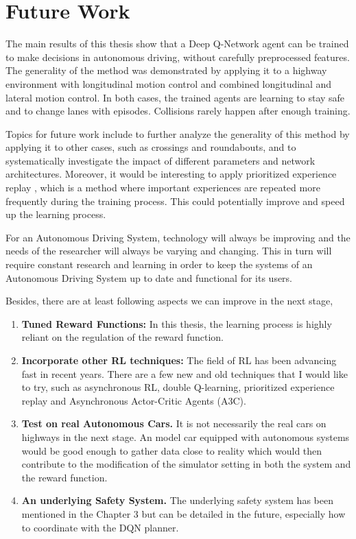 \chapter{Future Work}

The main results of this thesis show that a Deep Q-Network agent can be trained to make decisions in autonomous driving, without carefully preprocessed features. The generality of the method was demonstrated by applying it to a highway environment with longitudinal motion control and combined longitudinal and lateral motion control. In both cases, the trained agents are learning to stay safe and to change lanes with episodes. Collisions rarely happen after enough training. 

Topics for future work include to further analyze the generality of this method by applying it to other cases, such as crossings and roundabouts, and to systematically investigate the impact of different parameters and network architectures. Moreover, it would be interesting to apply prioritized experience replay \cite{Replay2015}, which is a method where important experiences are repeated more frequently during the training process. This could potentially improve and speed up the learning process.

For an Autonomous Driving System, technology will always be improving and the needs of the researcher will always be varying and changing. This in turn will require constant research and learning in order to keep the systems of an Autonomous Driving System up to date and functional for its users.

Besides, there are at least following aspects we can improve in the next stage,

\begin{enumerate}

    \item \textbf{Tuned Reward Functions:} In this thesis, the learning process is highly reliant on the regulation of the reward function.

    \item \textbf{Incorporate other RL techniques:} The field of RL has been advancing fast in recent years. There are a few new and old techniques that I would like to try, such as asynchronous RL, double Q-learning, prioritized experience replay and Asynchronous Actor-Critic Agents (A3C).
    \item \textbf{Test on real Autonomous Cars.} It is not necessarily the real cars on highways in the next stage. An model car equipped with autonomous systems would be good enough to gather data close to reality which would then contribute to the modification of the simulator setting in both the system and the reward function.
    \item \textbf{An underlying Safety System.} The underlying safety system has been mentioned in the Chapter 3 but can be detailed in the future, especially how to coordinate with the DQN planner.

\end{enumerate}
